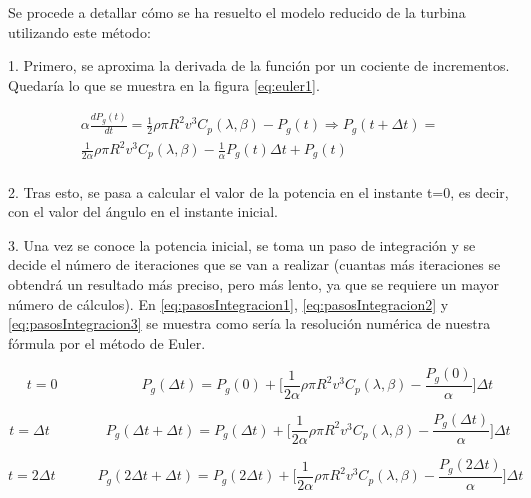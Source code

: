 Se procede a detallar cómo se ha resuelto el modelo reducido de la turbina utilizando este método:

    1. Primero, se aproxima la derivada de la función por un cociente de incrementos. Quedaría lo que se muestra en la figura \ref{eq:euler1}.
    
\begin{equation}
\begin{split}
    \alpha \frac{dP_{g}(t)}{dt} = \frac{1}{2} \rho \pi R^2 v^3 C_{p}(\lambda,\beta) - P_{g}(t) \Rightarrow P_{g}(t + \Delta t) = \\
    \frac{1}{2 \alpha} \rho \pi R^2 v^3 C_{p}(\lambda,\beta) - \frac{1}{\alpha} P_{g}(t) \Delta t + P_{g}(t)\\
\end{split}
\label{eq:euler1}
\end{equation}

    2. Tras esto, se pasa a calcular el valor de la potencia en el instante t=0, es decir, con el valor del ángulo en el instante inicial.
    
    3. Una vez se conoce la potencia inicial, se toma un paso de integración y se decide el número de iteraciones que se van a realizar (cuantas más iteraciones se obtendrá un resultado más preciso, pero más lento, ya que se requiere un mayor número de cálculos). En \ref{eq:pasosIntegracion1}, \ref{eq:pasosIntegracion2} y \ref{eq:pasosIntegracion3} se muestra como sería la resolución numérica de nuestra fórmula por el método de Euler.
    
\begin{equation}
    t=0 \quad \quad \quad \quad \quad \quad P_{g}(\Delta t) = P_{g}(0) + \biggr[\frac{1}{2 \alpha} \rho \pi R^2 v^3 C_{p}(\lambda,\beta) - \frac{P_{g}(0)}{\alpha}\biggr]\Delta t
    \label{eq:pasosIntegracion1}
\end{equation}

\begin{equation}
    t=\Delta t \quad \quad \quad \quad P_{g}(\Delta t + \Delta t) = P_{g}(\Delta t) + \biggr[\frac{1}{2 \alpha} \rho \pi R^2 v^3 C_{p}(\lambda,\beta) - \frac{P_{g}(\Delta t)}{\alpha}\biggr]\Delta t
    \label{eq:pasosIntegracion2}
\end{equation}

\begin{equation}
    t=2 \Delta t \quad \quad \quad P_{g}(2\Delta t + \Delta t) = P_{g}(2\Delta t) + \biggr[\frac{1}{2 \alpha} \rho \pi R^2 v^3 C_{p}(\lambda,\beta) - \frac{P_{g}(2\Delta t)}{\alpha}\biggr]\Delta t
    \label{eq:pasosIntegracion3}
\end{equation}
    
